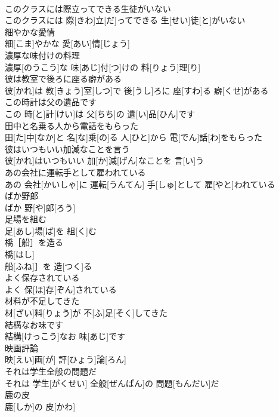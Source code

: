 \documentclass[8pt]{extreport}
\begin{document}
\begin{CJK}{UTF8}{min}
\\	このクラスには際立ってできる生徒がいない	
\\	このクラスには 際[きわ]立[だ]ってできる 生[せい]徒[と]がいない
\\	細やかな愛情	
\\	細[こま]やかな 愛[あい]情[じょう]
\\	濃厚な味付けの料理	
\\	濃厚[のうこう]な 味[あじ]付[つ]けの 料[りょう]理[り]
\\	彼は教室で後ろに座る癖がある	
\\	彼[かれ]は 教[きょう]室[しつ]で 後[うし]ろに 座[すわ]る 癖[くせ]がある
\\	この時計は父の遺品です	
\\	この 時[と]計[けい]は 父[ちち]の 遺[い]品[ひん]です
\\	田中と名乗る人から電話をもらった	
\\	田[た]中[なか]と 名[な]乗[の]る 人[ひと]から 電[でん]話[わ]をもらった
\\	彼はいつもいい加減なことを言う	
\\	彼[かれ]はいつもいい 加[か]減[げん]なことを 言[い]う
\\	あの会社に運転手として雇われている	
\\	あの 会社[かいしゃ]に 運転[うんてん] 手[しゅ]として 雇[やと]われている
\\	ばか野郎	
\\	ばか 野[や]郎[ろう]
\\	足場を組む	
\\	足[あし]場[ば]を 組[く]む
\\	橋［船］を造る	
\\	橋[はし]
\\	船[ふね]］を 造[つく]る
\\	よく保存されている	
\\	よく 保[ほ]存[ぞん]されている
\\	材料が不足してきた	
\\	材[ざい]料[りょう]が 不[ふ]足[そく]してきた
\\	結構なお味です	
\\	結構[けっこう]なお 味[あじ]です
\\	映画評論	
\\	映[えい]画[が] 評[ひょう]論[ろん]
\\	それは学生全般の問題だ	
\\	それは 学生[がくせい] 全般[ぜんぱん]の 問題[もんだい]だ
\\	鹿の皮	
\\	鹿[しか]の 皮[かわ]

\end{CJK}
\end{document}
